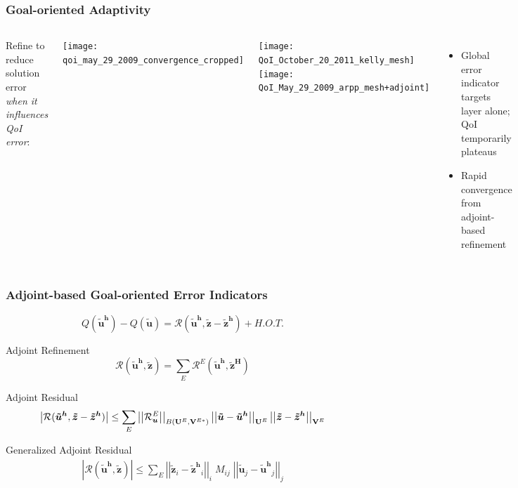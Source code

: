 \documentclass[mathserif]{beamer}
\newcommand{\abs}[1]{\ensuremath{ \left|#1\right|}}
\newcommand{\norm}[1]{\ensuremath{ \left|\left|#1\right|\right|}}
\newcommand{\bv}[1]{{\boldsymbol{#1}}}
\newcommand{\Qoi}{{\ensuremath{Q}}}
\newcommand{\Res}{{\ensuremath{\mathcal R}}}
\newcommand{\Unknowns}{{\ensuremath{\bf{U}}}}
\newcommand{\unknown}{{\ensuremath{\bv{u}}}}
\newcommand{\Testfuncs}{{\ensuremath{\bf{V}}}}
\newcommand{\primalsol}{{\ensuremath{\bv{\tilde{u}}}}}
\newcommand{\primalsolh}{{\ensuremath{\bv{\tilde{u}^h}}}}
\newcommand{\adjointsol}{{\ensuremath{\bv{\tilde{z}}}}}
\newcommand{\adjointsolh}{{\ensuremath{\bv{\tilde{z}^h}}}}
\newcommand{\adjointsolH}{{\ensuremath{\bv{\tilde{z}^H}}}}
\newcommand{\elem}{\ensuremath{E}}
\begin{document}
\begin{frame}
\frametitle{Goal-oriented Adaptivity}

\begin{columns}

Refine to reduce solution error {\emph{when it influences QoI error}}:

\begin{center}
\texttt{[image: qoi\_may\_29\_2009\_convergence\_cropped]}
\end{center}


\begin{center}
\texttt{[image: QoI\_October\_20\_2011\_kelly\_mesh]}
\texttt{[image: QoI\_May\_29\_2009\_arpp\_mesh+adjoint]}
\end{center}

\begin{itemize}
\item Global error indicator targets layer alone; QoI temporarily plateaus
\item Rapid convergence from adjoint-based refinement
\end{itemize}

\end{columns}

\end{frame}


\begin{frame}
\frametitle{Adjoint-based Goal-oriented Error Indicators}

\begin{equation*}
\Qoi(\primalsolh) - \Qoi(\primalsol) = \Res(\primalsolh, \adjointsol - \adjointsolh) + H.O.T.
\end{equation*}

\begin{block}{Adjoint Refinement}
\begin{equation*}
\Res(\primalsolh, \adjointsol) = \sum_\elem 
\Res^\elem(\primalsolh, \adjointsolH)
\end{equation*}
\end{block}

\begin{block}{Adjoint Residual}
\begin{equation*}
\abs{\Res(\primalsolh, \adjointsol - \adjointsolh)} \leq
\sum_\elem \norm{\Res^\elem_\unknown}_{B(\Unknowns^\elem,
\Testfuncs^{\elem *})}
\norm{\primalsol - \primalsolh}_{\Unknowns^\elem}
\norm{\adjointsol - \adjointsolh}_{\Testfuncs^\elem}
\end{equation*}
\end{block}

\begin{block}{Generalized Adjoint Residual}
\begin{align*}
\abs{\Res(\primalsolh, \adjointsol)}
\leq \sum_\elem \norm{\adjointsol_i-\adjointsolh_i}_i \; M_{ij} \; \norm{\primalsol_j-\primalsolh_j
}_j \nonumber
\end{align*}
\end{block}

\end{frame}
\end{document}

